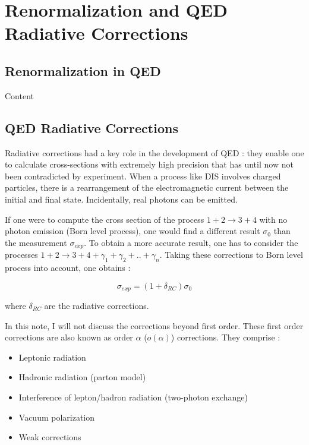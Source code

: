
\chapter{Renormalization and QED Radiative Corrections} %

\label{ch:Renorm} %


\section{Renormalization in QED}

Content


\section{QED Radiative Corrections}

Radiative corrections had a key role in the development of QED : they enable one to calculate cross-sections with extremely high precision
that has until now not been contradicted by experiment.
When a process like DIS involves charged particles, there is a rearrangement of the electromagnetic current between the initial and final state.
Incidentally, real photons can be emitted.

If one were to compute the cross section of the process $1+2 \rightarrow 3+4$ with no photon emission (Born level process), one would find a different result
$\sigma_{0}$ than the measurement $\sigma_{exp}$. To obtain a more accurate result, one has to consider the processes $1+2 \rightarrow 3+4+\gamma_1+\gamma_2+..+\gamma_n$.
Taking these corrections to Born level process into account, one obtains :

\begin{equation} \label{eq:RC}
  \sigma_{exp} = (1+\delta_{RC})\sigma_0
\end{equation}

where $\delta_{RC}$ are the radiative corrections.


In this note, I will not discuss the corrections beyond first order. These first order corrections are also known as order $\alpha$
($o(\alpha)$) corrections. They comprise :
\begin{itemize}
\item Leptonic radiation
\item Hadronic radiation (parton model)
\item Interference of lepton/hadron radiation (two-photon exchange)
\item Vacuum polarization
\item Weak corrections
\end{itemize}

